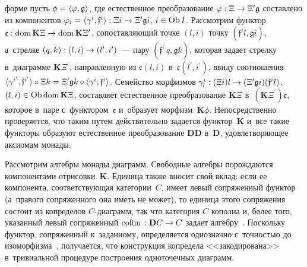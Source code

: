 \begin{multicols}{2}
\noindent
форме пусть $\phi\hm = \langle \varphi, \mathfrak{g}\rangle$, где 
естественное преобразование $\varphi : \Xi\hm\to \Xi^\prime 
\mathfrak{g}$ составлено из компонентов $\varphi_i \hm= \langle \gamma^i, 
\mathfrak{f}^ i\rangle : \Xi i \hm\to  \Xi^\prime \mathfrak{g}i$, $i 
\hm\in\mathrm{Ob}\, I$. Рассмотрим функтор~$\mathfrak{e} : 
\mathrm{dom}\,\mathbf{K}\Xi \hm\to 
\mathrm{dom}\,\mathbf{K}\Xi^\prime$, сопоставляющий точке $(l, i)$ точку 
$(\mathfrak{f}^il, \mathfrak{g}i)$, а~стрелке $(q, k) : (l, i) \hm\to  (l^\prime, 
i^\prime)$~--- пару $(\mathfrak{f}^{i^\prime}q, \mathfrak{g}k)$, которая задает 
стрелку в~диаграмме $\mathbf{K}\Xi^\prime$, направленную из 
$\mathfrak{e}(l, i)$ в~$\mathfrak{e}(l^\prime, i^\prime)$, ввиду соотношения 
$\langle \gamma^{i^\prime}, \mathfrak{f}^{i^\prime}\rangle \circ \Xi k \hm= 
\Xi^\prime \mathfrak{g}k \circ \langle \gamma^i, \mathfrak{f}^i\rangle$. 
Семейство морфизмов $\gamma^i_l : (\Xi i)l \hm\to  (\Xi^\prime 
\mathfrak{g}i)(\mathfrak{f}^il)$, $(l, i) \hm\in 
\mathrm{Ob}\,\mathrm{dom}\,\mathbf{K}\Xi$, составляет естественное 
преобразование $\mathbf{K}\Xi$ 
в~$(\mathbf{K}\Xi^\prime)\mathfrak{e}$, которое в~паре 
с~функтором~$\mathfrak{e}$ и~образует морфизм~$\mathbf{K}\phi$. 
Непосредственно проверяется, что таким путем действительно задается 
функтор~$\mathbf{K}$ и~все такие функторы образуют естественное 
преобразование $\mathbf{DD}$ в~$\mathbf{D}$, удовле\-тво\-ря\-ющее аксиомам 
монады.
     
     Рассмотрим алгебры монады диаграмм. Свободные алгебры порождаются 
компонентами отрисовки~$\mathbf{K}$. Единица также вносит свой вклад: 
если ее компонента, соответствующая категории~$C$, имеет левый 
сопряженный функтор (а~правого сопряженного она иметь не может), то 
единица этого сопряжения состоит из копределов $C$-диа\-грамм, так что 
категория $C$ кополна и, более того, указанный левый сопряженный $\mathrm{colim}\,: 
\mathbf{D}C \hm\to  C$ задает алгебру~\cite{7-kov}. Поскольку функтор, 
сопряженный к~заданному, определяется однозначно с~точностью до 
изоморфизма~\cite[\S\,~IV.1]{8-kov}, получается, что конструкция копредела 
<<закодирована>> в~тривиальной процедуре построения одноточечных 
диаграмм.
     

\end{multicols}
